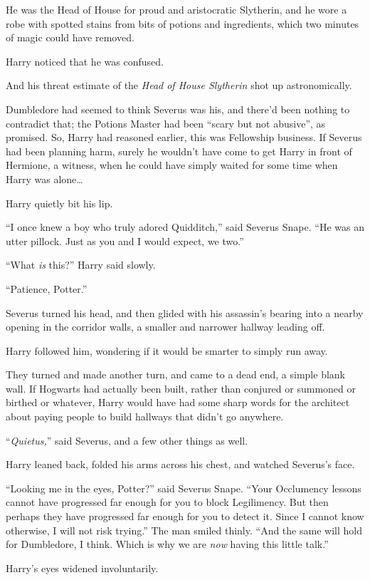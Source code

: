 He was the Head of House for proud and aristocratic Slytherin, and he wore a robe with spotted stains from bits of potions and ingredients, which two minutes of magic could have removed.

Harry noticed that he was confused.

And his threat estimate of the \emph{Head of House Slytherin} shot up astronomically.

Dumbledore had seemed to think Severus was his, and there’d been nothing to contradict that; the Potions Master had been “scary but not abusive”, as promised. So, Harry had reasoned earlier, this was Fellowship business. If Severus had been planning harm, surely he wouldn’t have come to get Harry in front of Hermione, a witness, when he could have simply waited for some time when Harry was alone…

Harry quietly bit his lip.

“I once knew a boy who truly adored Quidditch,” said Severus Snape. “He was an utter pillock. Just as you and I would expect, we two.”

“What \emph{is} this?” Harry said slowly.

“Patience, Potter.”

Severus turned his head, and then glided with his assassin’s bearing into a nearby opening in the corridor walls, a smaller and narrower hallway leading off.

Harry followed him, wondering if it would be smarter to simply run away.

They turned and made another turn, and came to a dead end, a simple blank wall. If Hogwarts had actually been built, rather than conjured or summoned or birthed or whatever, Harry would have had some sharp words for the architect about paying people to build hallways that didn’t go anywhere.

“\emph{Quietus,}” said Severus, and a few other things as well.

Harry leaned back, folded his arms across his chest, and watched Severus’s face.

“Looking me in the eyes, Potter?” said Severus Snape. “Your Occlumency lessons cannot have progressed far enough for you to block Legilimency. But then perhaps they have progressed far enough for you to detect it. Since I cannot know otherwise, I will not risk trying.” The man smiled thinly. “And the same will hold for Dumbledore, I think. Which is why we are \emph{now} having this little talk.”

Harry’s eyes widened involuntarily.

